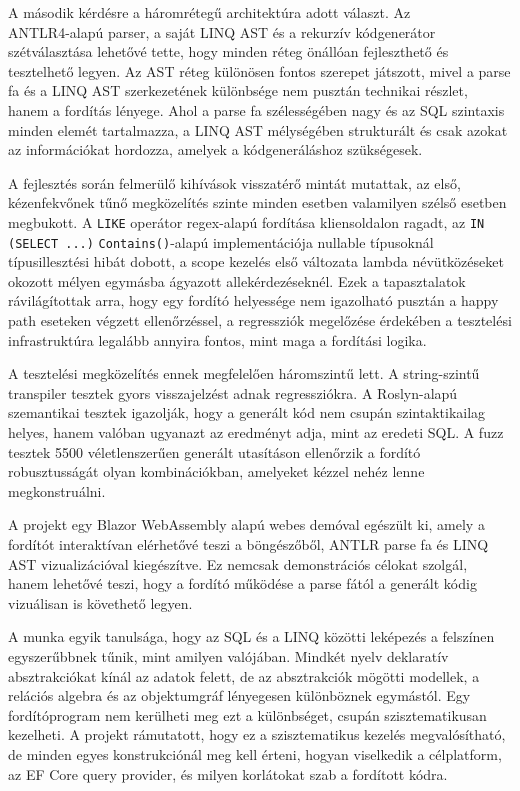 \documentclass[a4paper,12pt]{article}
\begin{document}
A második kérdésre a háromrétegű architektúra adott választ. Az \\ANTLR4-alapú parser, a saját LINQ AST és a rekurzív kódgenerátor szétválasztása lehetővé tette, hogy minden réteg önállóan fejleszthető és tesztelhető legyen. Az AST réteg különösen fontos szerepet játszott, mivel a parse fa és a LINQ AST szerkezetének különbsége nem pusztán technikai részlet, hanem a fordítás lényege. Ahol a parse fa szélességében nagy és az SQL szintaxis minden elemét tartalmazza, a LINQ AST mélységében strukturált és csak azokat az információkat hordozza, amelyek a kódgeneráláshoz szükségesek.

A fejlesztés során felmerülő kihívások visszatérő mintát mutattak, az első, kézenfekvőnek tűnő megközelítés szinte minden esetben valamilyen szélső esetben megbukott. A \texttt{LIKE} operátor regex-alapú fordítása kliensoldalon ragadt, az \texttt{IN (SELECT ...)} \texttt{Contains()}-alapú implementációja nullable típusoknál típusillesztési hibát dobott, a scope kezelés első változata lambda névütközéseket okozott mélyen egymásba ágyazott allekérdezéseknél. Ezek a tapasztalatok rávilágítottak arra, hogy egy fordító helyessége nem igazolható pusztán a happy path eseteken végzett ellenőrzéssel, a regressziók megelőzése érdekében a tesztelési infrastruktúra legalább annyira fontos, mint maga a fordítási logika.

A tesztelési megközelítés ennek megfelelően háromszintű lett. A string-szintű transpiler tesztek gyors visszajelzést adnak regressziókra. A Roslyn-alapú szemantikai tesztek igazolják, hogy a generált kód nem csupán szintaktikailag helyes, hanem valóban ugyanazt az eredményt adja, mint az eredeti SQL. A fuzz tesztek 5500 véletlenszerűen generált utasításon ellenőrzik a fordító robusztusságát olyan kombinációkban, amelyeket kézzel nehéz lenne megkonstruálni.

A projekt egy Blazor WebAssembly alapú webes demóval egészült ki, amely a fordítót interaktívan elérhetővé teszi a böngészőből, ANTLR parse fa és LINQ AST vizualizációval kiegészítve. Ez nemcsak demonstrációs célokat szolgál, hanem lehetővé teszi, hogy a fordító működése a parse fától a generált kódig vizuálisan is követhető legyen.

A munka egyik tanulsága, hogy az SQL és a LINQ közötti leképezés a felszínen egyszerűbbnek tűnik, mint amilyen valójában. Mindkét nyelv deklaratív absztrakciókat kínál az adatok felett, de az absztrakciók mögötti modellek, a relációs algebra és az objektumgráf lényegesen különböznek egymástól. Egy fordítóprogram nem kerülheti meg ezt a különbséget, csupán szisztematikusan kezelheti. A projekt rámutatott, hogy ez a szisztematikus kezelés megvalósítható, de minden egyes konstrukciónál meg kell érteni, hogyan viselkedik a célplatform, az EF Core query provider, és milyen korlátokat szab a fordított kódra.


\end{document}
